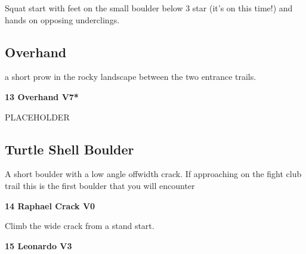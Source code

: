 \begin{multicols}{2}
\begin{adjustwidth}{0.5cm}{}
\begin{minipage}{\linewidth}
							\begin{adjustwidth}{0.5cm}{}				
							Squat start with feet on the small boulder below 3 star (it's on this time!) and hands on opposing underclings.
							\end{adjustwidth}
							\end{minipage}
						\end{adjustwidth}
			\subsection*{Overhand}\label{bf:Overhand}
			\begin{minipage}{\columnwidth}
			a short prow in the rocky landscape between the two entrance trails.
			\end{minipage}
			

					\begin{minipage}{\linewidth}	
					\label{rt:Overhand}
\colorbox{Goldenrod!50}{
\textbf{
13 Overhand V7*  
}
}

					\begin{adjustwidth}{0.5cm}{}				
					PLACEHOLDER
					\end{adjustwidth}
					\end{minipage}
			\subsection*{Turtle Shell Boulder}\label{bf:Turtle Shell Boulder}
			\begin{minipage}{\columnwidth}
			A short boulder with a low angle offwidth crack. If approaching on the fight club trail this is the first boulder that you will encounter
			\end{minipage}
			

					\begin{minipage}{\linewidth}	
					\label{rt:Raphael Crack}
\colorbox{green!20}{
\textbf{
14 Raphael Crack V0   
}
}

					\begin{adjustwidth}{0.5cm}{}				
					Climb the wide crack from a stand start.
					\end{adjustwidth}
					\end{minipage}
					\begin{minipage}{\linewidth}	
					\label{rt:Leonardo}
\colorbox{green!20}{
\textbf{
15 Leonardo V3   
}
}


\end{minipage}
\end{multicols}
